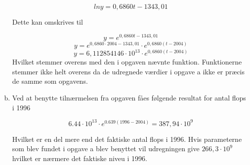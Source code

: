 \documentclass[12pt]{article}
\begin{document}
\begin{enumerate}[(a)]
$$
ln y=0,6860t-1343,01
$$

Dette kan omskrives til 


$$
y= e^{0,6860t-1343,01}
$$
$$
y= e^{0,6860 \cdot 2004-1343,01} \cdot e^{0,6860(t-2004)}
$$
$$
y= 6,112854146 \cdot 10^{13} \cdot e^{0,6860(t-2004)}
$$
Hvilket stemmer overens med den i opgaven nævnte funktion. Funktionerne stemmer
ikke helt overens da de udregnede værdier i opgave a ikke er præcis de samme
som opgavens.

\item  
Ved at benytte tilnærmelsen fra opgaven fåes følgende resultat for antal flops i
1996

$$
6.44\cdot10^{13} \cdot e^{0.639(1996-2004)}= 387,94 \cdot 10^{9}
$$

Hvilket er en del mere end det faktiske antal flops i 1996. Hvis parameterne som
blev fundet i opgave a blev benyttet vil udregningen give $266,3 \cdot 10^{9}$
hvilket er nærmere det faktiske niveu i 1996.
\end{enumerate}
\end{document}
